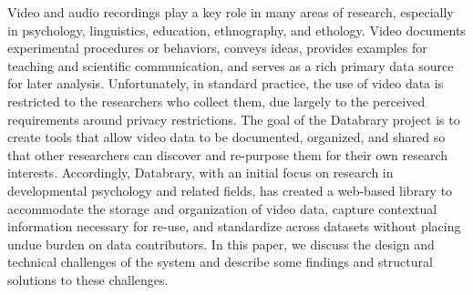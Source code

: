 \documentclass{sig-alternate}
\begin{document}

Video and audio recordings play a key role in many areas of research, especially in psychology, linguistics, education, ethnography, and ethology.
Video documents experimental procedures or behaviors, conveys ideas, provides examples for teaching and scientific communication, and serves as a rich primary data source for later analysis.
Unfortunately, in standard practice, the use of video data is restricted to the researchers who collect them, due largely to the perceived requirements around privacy restrictions.
The goal of the Databrary project is to create tools that allow video data to be documented, organized, and shared so that other researchers can discover and re-purpose them for their own research interests.
Accordingly, Databrary, with an initial focus on research in developmental psychology and related fields, has created a web-based library to accommodate the storage and organization of video data, capture contextual information necessary for re-use, and standardize across datasets without placing undue burden on data contributors.
In this paper, we discuss the design and technical challenges of the system and describe some findings and structural solutions to these challenges.

\end{document}
